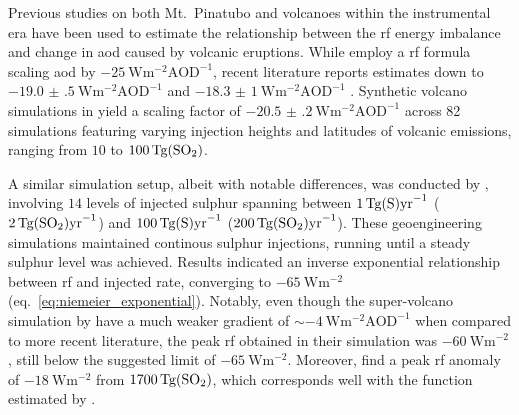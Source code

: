\documentclass{ametsocV6.1}
\newcommand{\iso}[1][i]{{#1}njected \ce{SO2}}
\begin{document}
Previous studies on both Mt.\ Pinatubo \citep{mills2017,hansen2005} and volcanoes within
the instrumental era \citep{gregory2016} have been used to estimate the relationship
between the \gls{rf} energy imbalance and change in \gls{aod} caused by volcanic
eruptions. While \citet{myhre2013} employ a \gls{rf} formula scaling \gls{aod} by
\(\SI{-25}{\watt\metre^{-2}\mathrm{AOD}^{-1}}\), recent literature reports estimates
down to \(\SI{-19.0(5)}{\watt\metre^{-2}\mathrm{AOD}^{-1}}\) \citep{gregory2016} and
\(\SI{-18.3(10)}{\watt\metre^{-2}\mathrm{AOD}^{-1}}\) \citep{mills2017}. Synthetic
volcano simulations in \citet{marshall2020} yield a scaling factor of
\(\SI{-20.5(2)}{\watt\metre^{-2}\mathrm{AOD}^{-1}}\) across 82 simulations featuring
varying injection heights and latitudes of volcanic emissions, ranging from \(10\) to
\(\SI{100}{\tera\gram(\ce{SO2})}\).

A similar simulation setup, albeit with notable differences, was conducted by
\citet{niemeier2015}, involving \(14\) levels of injected sulphur spanning between
\(\SI{1}{\tera\gram(\ce{S})\mathrm{yr}^{-1}}\)
(\(\SI{2}{\tera\gram(\ce{SO2})\mathrm{yr}^{-1}}\)) and
\(\SI{100}{\tera\gram(\ce{S})\mathrm{yr}^{-1}}\)
(\(\SI{200}{\tera\gram(\ce{SO2})\mathrm{yr}^{-1}}\)). These geoengineering simulations
maintained continous sulphur injections, running until a steady sulphur level was
achieved. Results indicated an inverse exponential relationship between \gls{rf} and
\iso{} rate, converging to \(\SI{-65}{\watt\metre^{-2}}\)
(eq.~\ref{eq:niemeier_exponential}). Notably, even though the super-volcano simulation
by \citet{jones2005} have a much weaker gradient of \(\sim
\SI{-4}{\watt\metre^{-2}\mathrm{AOD}^{-1}}\) when compared to more recent literature,
the peak \gls{rf} obtained in their simulation was \(\SI{-60}{\watt\metre^{-2}}\), still
below the suggested limit of \(\SI{-65}{\watt\metre^{-2}}\). Moreover,
\citet{timmreck2010} find a peak \gls{rf} anomaly of \(\SI{-18}{\watt\metre^{-2}}\) from
\(\SI{1700}{\tera\gram(\ce{SO2})}\), which corresponds well with the function estimated
by \citet{niemeier2015}.
\end{document}
